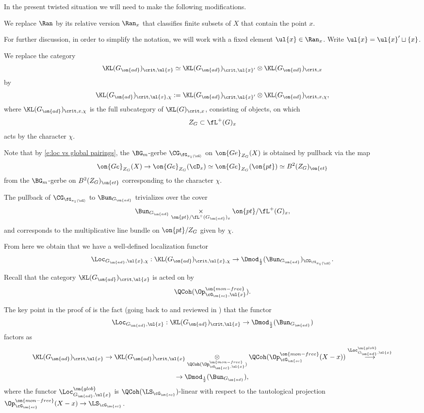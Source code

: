 \documentclass[9pt]{amsart}
\theoremstyle{remark}
\theoremstyle{definition}
\theoremstyle{remark}
\numberwithin{equation}{section}
\begin{document}
In the present twisted situation we will need to make the following modifications.

\sssec{}

We replace $\Ran$ by its relative version $\Ran_x$ that classifies finite subsets of $X$
that contain the point $x$. 

\medskip

For further discussion, in order to simplify the notation, we will work with a fixed element 
$\ul{x}\in \Ran_x$. Write $\ul{x}=\ul{x}'\sqcup \{x\}$.
 
\sssec{}

We replace the category 
$$\KL(G_{\on{ad}})_{\crit,\ul{x}}\simeq \KL(G_{\on{ad}})_{\crit,\ul{x}'}\otimes \KL(G_{\on{ad}})_{\crit,x}$$
by 
$$\KL(G_{\on{ad}})_{\crit,\ul{x},\chi}:=\KL(G_{\on{ad}})_{\crit,\ul{x}'}\otimes \KL(G_{\on{ad}})_{\crit,x,\chi},$$
where $\KL(G_{\on{ad}})_{\crit,x,\chi}$ is the full subcategory of $\KL(G)_{\crit,x}$, consisting of objects,
on which $$Z_G\subset \fL^+(G)_x$$ acts by the character $\chi$. 

\sssec{}

Note that by \eqref{e:loc vs global pairings}, the $\BG_m$-gerbe $\CG_{\fG_{\pi_1(\cG)}}$ on $\on{Ge}_{Z_G}(X)$ 
is obtained by pullback via the map
$$\on{Ge}_{Z_G}(X)\to \on{Ge}_{Z_G}(\cD_x)\simeq \on{Ge}_{Z_G}(\on{pt})\simeq B^2(Z_G)_{\on{et}}$$
from the $\BG_m$-gerbe on $B^2(Z_G)_{\on{et}}$ corresponding to the character $\chi$. 

\medskip

The pullback of $\CG_{\fG_{\pi_1(\cG)}}$ to $\Bun_{G_{\on{ad}}}$ trivializes over the cover
$$\Bun_{G_{\on{ad}}}\underset{\on{pt}/\fL^+(G_{\on{ad}})_x}\times \on{pt}/\fL^+(G)_x,$$
and corresponds to the multiplicative line bundle on $\on{pt}/Z_G$ given by $\chi$. 

\medskip

From here we obtain that we have a well-defined localization functor
$$\Loc_{G_{\on{ad}},\ul{x},\chi}:\KL(G_{\on{ad}})_{\crit,\ul{x},\chi}\to \Dmod_{\frac{1}{2}}(\Bun_{G_{\on{ad}}})_{\CG_{\fG_{\pi_1(\cG)}}}.$$

\sssec{}

Recall that the category $\KL(G_{\on{ad}})_{\crit,\ul{x}}$ is acted on by
$$\QCoh(\Op^{\on{mon-free}}_{\cG_{\on{sc}},\ul{x}}).$$

The key point in the proof of \cite[Theorem 4.5.2]{Ga4} is the fact (going back to \cite{BD} and reviewed in \cite[Sects. 15-16]{GLC2}) that the functor 
$$\Loc_{G_{\on{ad}},\ul{x}}:\KL(G_{\on{ad}})_{\crit,\ul{x}}\to \Dmod_{\frac{1}{2}}(\Bun_{G_{\on{ad}}})$$ factors as
\begin{multline*} 
\KL(G_{\on{ad}})_{\crit,\ul{x}}\to
\KL(G_{\on{ad}})_{\crit,\ul{x}}\underset{\QCoh(\Op^{\on{mon-free}}_{\cG_{\on{sc}},\ul{x}})}\otimes
\QCoh(\Op^{\on{mon-free}}_{\cG_{\on{sc}}}(X-x))\overset{\Loc^{\on{glob}}_{G_{\on{ad}},\ul{x}}}\longrightarrow \\
\to \Dmod_{\frac{1}{2}}(\Bun_{G_{\on{ad}}}),
\end{multline*}
where the functor $\Loc_{G_{\on{ad}},\ul{x}}^{\on{glob}}$ is $\QCoh(\LS_{\cG_{\on{sc}}})$-linear with respect to the tautological projection
$\Op^{\on{mon-free}}_{\cG_{\on{sc}}}(X-x)\to \LS_{\cG_{\on{sc}}}$.
\end{document}

